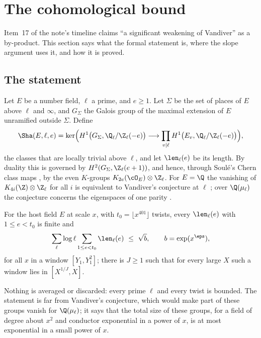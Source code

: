 \section{The cohomological bound}\label{sec:cohomology}

Item~17 of the note's timeline claims ``a significant weakening of Vandiver'' as a by-product.
This section says what the formal statement is, where the slope argument uses it, and how it is
proved.

\subsection{The statement}
Let $E$ be a number field, $\ell$ a prime, and $e\ge1$. Let $\Sigma$ be the set of places of $E$
above $\ell$ and $\infty$, and $G_\Sigma$ the Galois group of the maximal extension of $E$ unramified
outside $\Sigma$. Define \lvS
\[
\Sha(E,\ell,e)=\ker\Bigl(H^1\bigl(G_\Sigma,\Q_\ell/\Z_\ell(-e)\bigr)\longrightarrow
\prod_{v\mid\ell}H^1\bigl(E_v,\Q_\ell/\Z_\ell(-e)\bigr)\Bigr),
\]
the classes that are locally trivial above $\ell$, and let $\len_\ell(e)$ be its length. By
duality this is governed by $H^2(G_\Sigma,\Z_\ell(e+1))$, and hence, through Soul\'e's Chern class
maps \cite{soule1979}, by the even $K$-groups $K_{2e}(\cO_E)\otimes\Z_\ell$. For $E=\Q$ the
vanishing of $K_{4i}(\Z)\otimes\Z_\ell$ for all $i$ is equivalent to Vandiver's conjecture at
$\ell$ \cite{kurihara1992}; over $\Q(\mu_\ell)$ the conjecture concerns the eigenspaces of one
parity \cite{washington1997}.

\begin{statement}\label{st:vwin}
For the host field $E$ at scale $x$, with $t_0=\lfloor x^{401}\rfloor$ twists, every
$\len_\ell(e)$ with $1\le e<t_0$ is finite and
\[
\sum_{\ell}\log\ell\sum_{1\le e<t_0}\len_\ell(e)\ \le\ \sqrt{b},\qquad b=\exp(x^{\eps}),
\]
for all $x$ in a window $[Y_1,Y_1^2]$; there is $J\ge1$ such that for every large $X$ such a
window lies in $[X^{1/J},X]$.
\end{statement}
Nothing is averaged or discarded: every prime $\ell$ and every twist is bounded. The statement
is far from Vandiver's conjecture, which would make part of these groups vanish for
$\Q(\mu_\ell)$; it says that the total size of these groups, for a field of degree about $x^2$
and conductor exponential in a power of $x$, is at most exponential in a small power of $x$.


